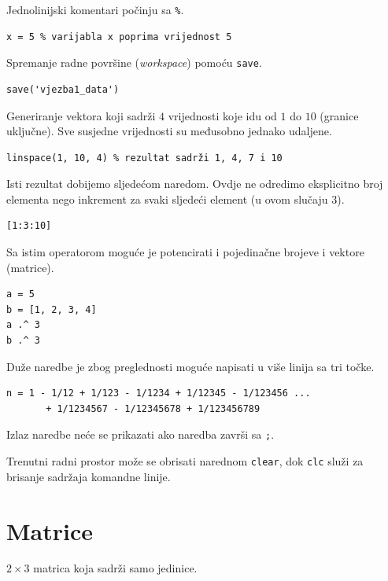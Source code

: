 \documentclass[a4paper, 10pt]{article}
\begin{document}
Jednolinijski komentari počinju sa \texttt{\%}.

\begin{lstlisting}
x = 5 % varijabla x poprima vrijednost 5
\end{lstlisting}

Spremanje radne površine (\textit{workspace}) pomoću \texttt{save}.

\begin{lstlisting}
save('vjezba1_data')
\end{lstlisting}

Generiranje vektora koji sadrži $4$ vrijednosti koje idu od $1$ do $10$ (granice uključne). Sve susjedne vrijednosti su međusobno jednako udaljene.

\begin{lstlisting}
linspace(1, 10, 4) % rezultat sadrži 1, 4, 7 i 10
\end{lstlisting}

Isti rezultat dobijemo sljedećom naredom. Ovdje ne odredimo eksplicitno broj elementa nego inkrement za svaki sljedeći element (u ovom slučaju $3$).

\begin{lstlisting}
[1:3:10]
\end{lstlisting}

Sa istim operatorom moguće je potencirati i pojedinačne brojeve i vektore (matrice).

\begin{lstlisting}
a = 5
b = [1, 2, 3, 4]
a .^ 3
b .^ 3
\end{lstlisting}

Duže naredbe je zbog preglednosti moguće napisati u više linija sa tri točke.

\begin{lstlisting}
n = 1 - 1/12 + 1/123 - 1/1234 + 1/12345 - 1/123456 ...
       + 1/1234567 - 1/12345678 + 1/123456789
\end{lstlisting}

Izlaz naredbe neće se prikazati ako naredba završi sa \texttt{;}.

Trenutni radni prostor može se obrisati narednom \texttt{clear}, dok \texttt{clc} služi za brisanje sadržaja komandne linije.

\section{Matrice}

$2 \times 3$ matrica koja sadrži samo jedinice.
\end{document}
